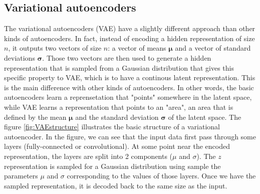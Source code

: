 \documentclass{article}
\begin{document}
\subsection{Variational autoencoders} \label{background-vae}

The variational autoencoders (VAE) \cite{kingma2013autoencoding} have a slightly different approach than other kinds of autoencoders. In fact, instead of encoding a hidden representation of size $n$, it outputs two vectors of size $n$: a vector of means $\boldsymbol \mu$ and a vector of standard deviations $\boldsymbol \sigma$. Those two vectors are then used to generate a hidden representation that is sampled from a Gaussian distribution that gives this specific property to VAE, which is to have a continous latent representation. This is the main difference with other kinds of autoencoders. In other words, the basic autoencoders learn a reprensetation that "points" somewhere in the latent space, while VAE learns a representation that points to an "area", an area that is defined by the mean $\boldsymbol \mu$ and the standard deviation $\boldsymbol \sigma$ of the latent space. The figure \ref{fig:VAEstructure} illustrates the basic structure of a variational autoencoder. In the figure, we can see that the input data first pass through some layers (fully-connected or convolutional). At some point near the encoded representation, the layers are split into 2 components ($\mu$ and $\sigma$). The $z$ representation is sampled for a Gaussian distribution using sample the parameters $\mu$ and $\sigma$ corresponding to the values of those layers. Once we have the sampled representation, it is decoded back to the same size as the input. 
\end{document}
